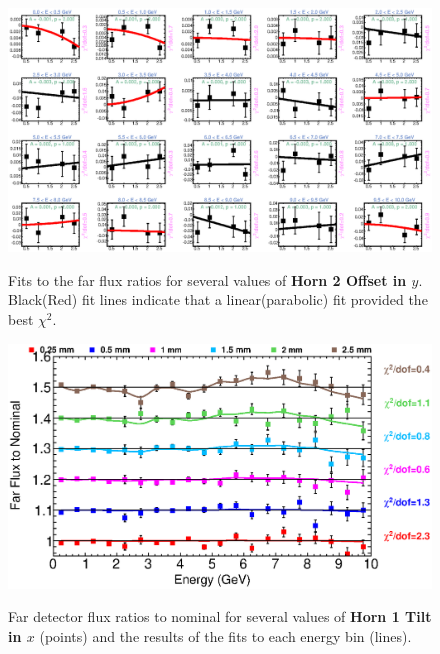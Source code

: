{\begin{figure}[ht]
  \begin{center}
    {\includegraphics[width=5.0in]{figures/Horn2YOffset_far_fits.eps}}
  \end{center}
\caption{ Fits to the far flux ratios for several values of {\bf Horn 2 Offset in $y$}. Black(Red) fit lines indicate that a linear(parabolic) fit provided the best $\chi^2$. }
\end{figure}

\begin{figure}[ht]
  \begin{center}
    {\includegraphics[width=6.0in]{figures/Horn1XTilt_far_summary.eps}}
  \end{center}
\caption{ Far detector flux ratios to nominal for several values of {\bf Horn 1 Tilt in $x$} (points) and the results of the fits to each energy bin (lines).}
\end{figure}

}
